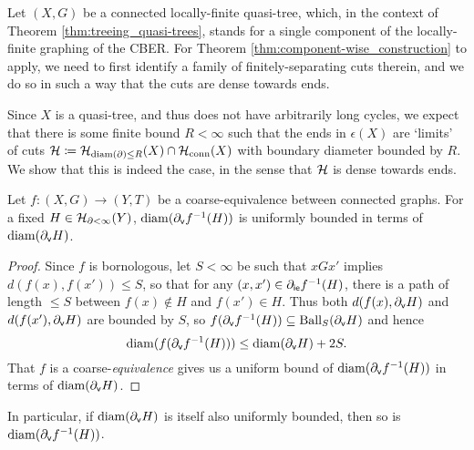 \documentclass[reqno]{amsart}
\begin{document}
    Let $(X,G)$ be a connected locally-finite quasi-tree, which, in the context of Theorem \ref{thm:treeing_quasi-trees}, stands for a single component of the locally-finite graphing of the CBER. For Theorem \ref{thm:component-wise_construction} to apply, we need to first identify a family of finitely-separating cuts therein, and we do so in such a way that the cuts are dense towards ends.

    Since $X$ is a quasi-tree, and thus does not have arbitrarily long cycles, we expect that there is some finite bound $R<\infty$ such that the ends in $\epsilon(X)$ are `limits' of cuts $\mathcal{H}\coloneqq\mathcal{H}_{\operatorname{diam}(\partial)\leq R}(X)\cap\mathcal{H}_\mathrm{conn}(X)$ with boundary diameter bounded by $R$. We show that this is indeed the case, in the sense that $\mathcal{H}$ is dense towards ends.

    \begin{lemma}\label{lem:coarse_equivalence_controls_boundary_diameter}
        Let $f:(X,G)\to(Y,T)$ be a coarse-equivalence between connected graphs. For a fixed $H\in\mathcal{H}_{\partial<\infty}(Y)$, $\operatorname{diam}(\partial_\mathsf{v}f^{-1}(H))$ is uniformly bounded in terms of $\operatorname{diam}(\partial_\mathsf{v}H)$.
    \end{lemma}
    \begin{proof}
        Since $f$ is bornologous, let $S<\infty$ be such that $xGx'$ implies $d(f(x),f(x'))\leq S$, so that for any $(x,x')\in\partial_\mathsf{ie}f^{-1}(H)$, there is a path of length $\leq S$ between $f(x)\not\in H$ and $f(x')\in H$. Thus both $d(f(x),\partial_\mathsf{v}H)$ and $d(f(x'),\partial_\mathsf{v}H)$ are bounded by $S$, so $f(\partial_\mathsf{v}f^{-1}(H))\subseteq\operatorname{Ball}_S(\partial_\mathsf{v}H)$ and hence
        \begin{equation*}
            \operatorname{diam}(f(\partial_\mathsf{v}f^{-1}(H)))\leq\operatorname{diam}(\partial_\mathsf{v}H)+2S.
        \end{equation*}
        That $f$ is a coarse-\textit{equivalence} gives us a uniform bound of $\operatorname{diam}(\partial_\mathsf{v}f^{-1}(H))$ in terms of $\operatorname{diam}(\partial_\mathsf{v}H)$.
    \end{proof}

    In particular, if $\operatorname{diam}(\partial_\mathsf{v}H)$ is itself also uniformly bounded, then so is $\operatorname{diam}(\partial_\mathsf{v}f^{-1}(H))$.
\end{document}
